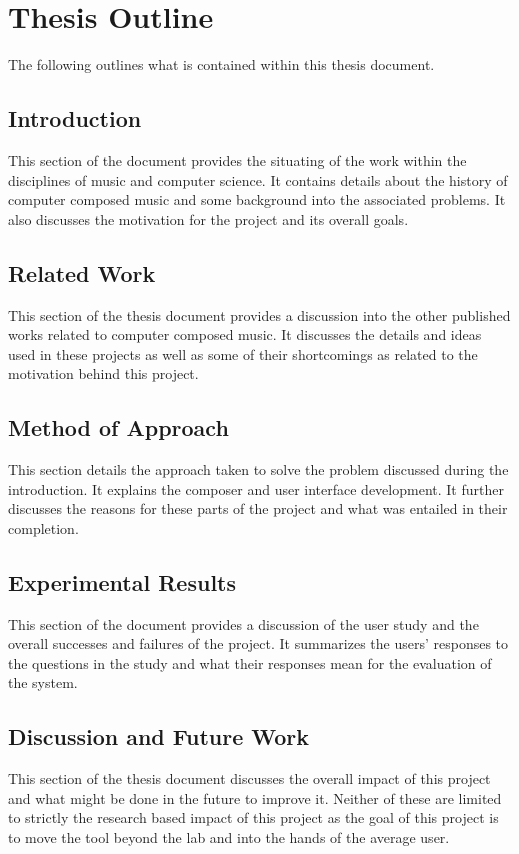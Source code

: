 \section{Thesis Outline}
\label{sec:thesisoutline}

The following outlines what is contained within this thesis document.

\subsection{Introduction}
\label{subsec:thesisoutlineintroduction}

This section of the document provides the situating of the work within the disciplines of music and computer science.  It contains details about the history of computer composed music and some background into the associated problems.  It also discusses the motivation for the project and its overall goals.

\subsection{Related Work}
\label{subsec:thesisoutlinerelatedwork}

This section of the thesis document provides a discussion into the other published works related to computer composed music.  It discusses the details and ideas used in these projects as well as some of their shortcomings as related to the motivation behind this project.

\subsection{Method of Approach}
\label{subsec:thesisoutlinemethodofapproach}

This section details the approach taken to solve the problem discussed during the introduction.  It explains the composer and user interface development.  It further discusses the reasons for these parts of the project and what was entailed in their completion.

\subsection{Experimental Results}
\label{subsec:thesisoutlineexperimentalresults}

This section of the document provides a discussion of the user study and the overall successes and failures of the project.  It summarizes the users' responses to the questions in the study and what their responses mean for the evaluation of the system.

\subsection{Discussion and Future Work}
\label{subsec:thesisoutlinediscusionandfuturework}

This section of the thesis document discusses the overall impact of this project and what might be done in the future to improve it.  Neither of these are limited to strictly the research based impact of this project as the goal of this project is to move the tool beyond the lab and into the hands of the average user.